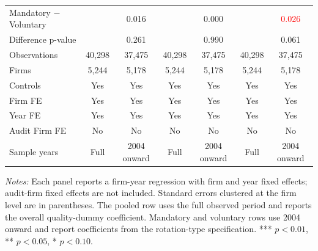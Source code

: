 \begin{table}[htbp]
\begin{threeparttable}
{\begin{tabular}{l cc cc cc}
Mandatory $-$ Voluntary &  & 0.016 &  & 0.000 &  & \textcolor{red}{0.026\sym{*}} \\
Difference p-value &  & 0.261 &  & 0.990 &  & 0.061 \\
Observations & 40,298 & 37,475 & 40,298 & 37,475 & 40,298 & 37,475 \\
Firms & 5,244 & 5,178 & 5,244 & 5,178 & 5,244 & 5,178 \\
\midrule
Controls & Yes & Yes & Yes & Yes & Yes & Yes \\
Firm FE & Yes & Yes & Yes & Yes & Yes & Yes \\
Year FE & Yes & Yes & Yes & Yes & Yes & Yes \\
Audit Firm FE & No & No & No & No & No & No \\
Sample years & Full & 2004 onward & Full & 2004 onward & Full & 2004 onward \\
\bottomrule
\end{tabular}}
\begin{tablenotes}\footnotesize
\item \textit{Notes:} Each panel reports a firm-year regression with firm and year fixed effects; audit-firm fixed effects are not included. Standard errors clustered at the firm level are in parentheses. The pooled row uses the full observed period and reports the overall quality-dummy coefficient. Mandatory and voluntary rows use 2004 onward and report coefficients from the rotation-type specification. *** \(p<0.01\), ** \(p<0.05\), * \(p<0.10\).
\end{tablenotes}
\end{threeparttable}
\end{table}
